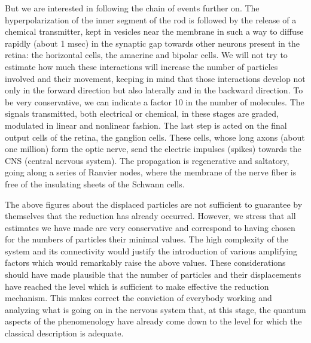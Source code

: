 \documentclass[12pt]{article}
\begin{document}
But we are interested in following the chain of events further on.
The hyperpolarization of the inner segment of the rod is followed
by the release of a chemical transmitter, kept in vesicles near
the membrane in such a way to diffuse rapidly (about 1 msec) in
the synaptic gap towards other neurons present in the retina: the
horizontal cells, the amacrine and bipolar cells. We will not try
to estimate how much these interactions will increase the number
of particles involved and their movement, keeping in mind that
those interactions develop not only in the forward direction but
also laterally and in the backward direction. To be very
conservative, we can indicate a factor 10 in the number of
molecules. The signals transmitted, both electrical or chemical,
in these stages are graded, modulated in linear and nonlinear
fashion. The last step is acted on the final output cells of the
retina, the ganglion cells. These cells, whose long axons (about
one million) form the optic nerve, send the electric impulses
(spikes) towards the CNS (central nervous system). The propagation
is regenerative and saltatory, going along a series of Ranvier
nodes, where the membrane of the nerve fiber is free of the
insulating sheets of the Schwann cells.

The above figures about the displaced particles are not sufficient
to guarantee by themselves that the reduction has already
occurred. However, we stress that all estimates we have made are
very conservative and correspond to having chosen for the numbers
of particles their minimal values. The high complexity of the
system and its connectivity would justify the introduction of
various amplifying factors which would remarkably raise the above
values. These considerations should have made plausible that the
number of particles and their displacements have reached the level
which is sufficient to make effective the reduction mechanism.
This makes correct the conviction of everybody working and
analyzing what is going on in the nervous system that, at this
stage, the quantum aspects of the phenomenology have already come
down to the level for which the classical description is adequate.
\end{document}
